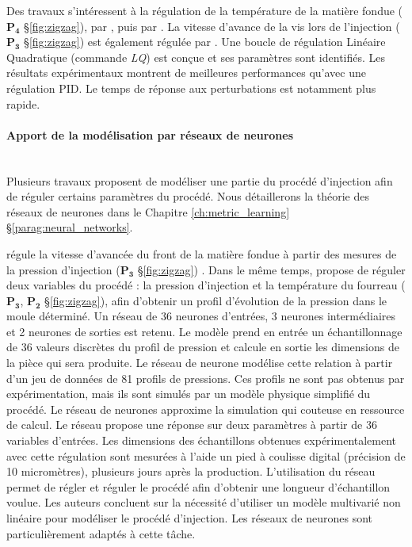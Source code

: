 Des travaux s'intéressent à la régulation de la température de la matière fondue ($\boldsymbol{P_4}$  §\ref{fig:zigzag}), par \citeauthor{kamal_injection_1986} \cite{kamal_injection_1986, gomes_injection_1986}, puis par \citeauthor{gustafson_model_1987} \cite{gustafson_model_1987}.
La vitesse d’avance de la vis lors de l’injection ($\boldsymbol{P_3}$ §\ref{fig:zigzag}) est également régulée par \citeauthor{pandelidis_optimal_1988} \cite{pandelidis_optimal_1988}.
Une boucle de régulation Linéaire Quadratique (commande \textit{LQ}) est conçue et ses paramètres sont identifiés.
Les résultats expérimentaux montrent de meilleures performances qu’avec une régulation PID.
Le temps de réponse aux perturbations est notamment plus rapide.

\paragraph{Apport de la modélisation par réseaux de neurones}\mbox{} \\
Plusieurs travaux proposent de modéliser une partie du procédé d'injection afin de réguler certains paramètres du procédé.
Nous détaillerons la théorie des réseaux de neurones dans le Chapitre \ref{ch:metric_learning} §\ref{parag:neural_networks}.

\citeauthor{demirci_numerical_1997} régule la vitesse d'avancée du front de la matière fondue à partir des mesures de la pression d'injection ($\boldsymbol{P_3}$ §\ref{fig:zigzag}) \cite{demirci_numerical_1997}.
Dans le même temps, \citeauthor{woll_pattern-based_1997} \cite{woll_pattern-based_1997} propose de réguler deux variables du procédé : la pression d'injection et la température du fourreau ($\boldsymbol{P_3}$, $\boldsymbol{P_2}$ §\ref{fig:zigzag}), afin d'obtenir un profil d'évolution de la pression dans le moule déterminé.
Un réseau de 36 neurones d'entrées, 3 neurones intermédiaires et 2 neurones de sorties est retenu.
Le modèle prend en entrée un échantillonnage de 36 valeurs discrètes du profil de pression et calcule en sortie les dimensions de la pièce qui sera produite.
Le réseau de neurone modélise cette relation à partir d'un jeu de données de 81 profils de pressions.
Ces profils ne sont pas obtenus par expérimentation, mais ils sont simulés par un modèle physique simplifié du procédé.
Le réseau de neurones approxime la simulation qui couteuse en ressource de calcul.
Le réseau propose une réponse sur deux paramètres à partir de 36 variables d’entrées.
Les dimensions des échantillons obtenues expérimentalement avec cette régulation sont mesurées à l’aide un pied à coulisse digital (précision de 10 micromètres), plusieurs jours après la production.
L’utilisation du réseau permet de régler et réguler le procédé afin d’obtenir une longueur d’échantillon voulue.
Les auteurs concluent sur la nécessité d’utiliser un modèle multivarié non linéaire pour modéliser le procédé d’injection.
Les réseaux de neurones sont particulièrement adaptés à cette tâche.

